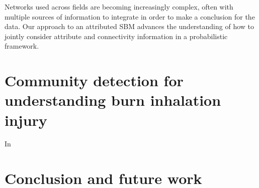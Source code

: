 Networks used across fields are becoming increasingly complex, often with multiple sources of information to integrate in order to make a conclusion for the data. Our approach to an attributed SBM advances the understanding of how to jointly consider attribute and connectivity information in a probabilistic framework.  

\chapter{Community detection for understanding burn inhalation injury}
\indent In 

\chapter{Conclusion and future work}






